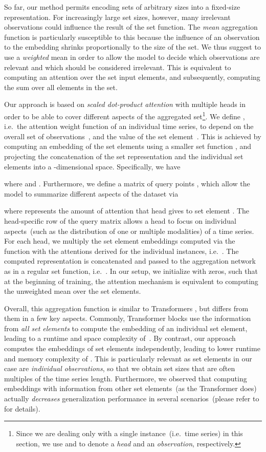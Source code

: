 \documentclass{article}
\begin{document}
So far, our method permits encoding sets of arbitrary sizes into
a fixed-size representation. For increasingly large set sizes, however,
many irrelevant observations could influence the result of the set
function. The \emph{mean} aggregation function is particularly
susceptible to this because the influence of an observation to the
embedding shrinks proportionally to the size of the set.
We thus suggest to use a \emph{weighted} mean in order to allow the
model to decide which observations are relevant and which should be
considered irrelevant. This is equivalent to computing an attention
over the set input elements, and
subsequently, computing the sum over all elements in the set.

Our approach is based on \emph{scaled dot-product attention} with
multiple heads  in order to be able to cover
different aspects of the aggregated set\footnote{Since we are dealing only with a single instance~(i.e.\ time series)
  in this section, we use  and  to denote
  a \emph{head} and an \emph{observation}, respectively.
}.
We define , i.e.\ the attention weight
function of an individual time series, to depend on the overall set
of observations~, and the value of the set element~.
This is achieved by computing an embedding of the set
elements using a smaller set function , and projecting the
concatenation of the set representation and the individual set elements
into a \mbox{-dimensional} space. Specifically, we have

where  and .
Furthermore, we define a matrix of query points , which allow the model to summarize different aspects of the dataset
via

where  represents the amount of attention that head 
gives to set element .
The head-specific row  of the query matrix  allows a head to
focus on individual aspects~(such as the distribution of one or multiple
modalities) of a time series.
For each head, we multiply the set element embeddings
computed via the function  with the attentions derived for the
individual instances, i.e.\ .
The computed representation is concatenated and passed to the aggregation
network  as in a regular set function, i.e.\
.
In our setup, we initialize  with zeros, such that at the beginning of
training, the attention mechanism is equivalent to computing the unweighted
mean over the set elements.

Overall, this aggregation function is similar to Transformers
\citep{vaswani2017attention}, but differs from them in a few key
aspects. Commonly, Transformer blocks use the information from
\emph{all set elements} to compute the embedding of an individual set element,
leading to a runtime and space complexity of~. By contrast,
our approach computes the embeddings of set elements independently, leading
to lower runtime and memory complexity of . This is
particularly relevant as set elements in our case are \emph{individual
observations}, so that we obtain  set sizes that are often multiples of the
time series length. Furthermore, we observed that computing embeddings
with information from other set elements~(as the Transformer does)
actually \emph{decreases} generalization performance in several
scenarios~(please refer to  for details).
\end{document}
